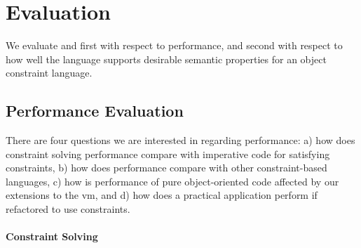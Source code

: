 \section{Evaluation}
\label{sec:evaluation}

We evaluate \langname and \toolname first with respect to performance,
and second with respect to how well the language supports desirable
semantic properties for an object constraint language.

\subsection{Performance Evaluation}
\label{sec:performance-evaluation}

There are four questions we are interested in regarding performance:
a) how does constraint solving performance compare with imperative
code for satisfying constraints, b) how does \toolname performance
compare with other constraint-based languages, c) how is performance
of pure object-oriented code affected by our extensions to the
\ac{vm}, and d) how does a practical application perform if refactored
to use constraints.

\paragraph{Constraint Solving}

